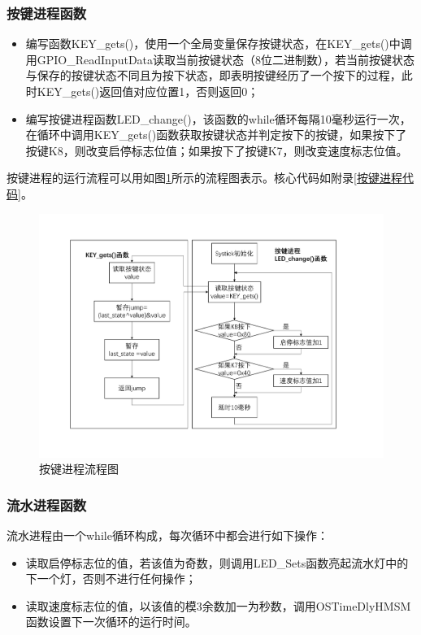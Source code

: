 \documentclass[a4paper]{ctexart}
\begin{document}
\begin{spacing}{1.3}
	\subsubsection{按键进程函数}\label{按键进程}
	\begin{itemize}
		\item 编写函数KEY\_gets()，使用一个全局变量保存按键状态，在KEY\_gets()中调用GPIO\_ReadInputData读取当前按键状态（8位二进制数），若当前按键状态与保存的按键状态不同且为按下状态，即表明按键经历了一个按下的过程，此时KEY\_gets()返回值对应位置1，否则返回0；
		\item 编写按键进程函数LED\_change()，该函数的while循环每隔10毫秒运行一次，在循环中调用KEY\_gets()函数获取按键状态并判定按下的按键，如果按下了按键K8，则改变启停标志位值；如果按下了按键K7，则改变速度标志位值。
	\end{itemize}

	按键进程的运行流程可以用如图\ref{fig:KEY流程图}所示的流程图表示。核心代码如附录\ref{按键进程代码}。

	\begin{figure}[htbp]
		\centering
		\includegraphics[width=\textwidth]{figure/KEYflow.pdf}
		\caption{按键进程流程图}\label{fig:KEY流程图}
	\end{figure}

	\subsubsection{流水进程函数}\label{流水进程}
	流水进程由一个while循环构成，每次循环中都会进行如下操作：
	\begin{itemize}
		\item 读取启停标志位的值，若该值为奇数，则调用LED\_Sets函数亮起流水灯中的下一个灯，否则不进行任何操作；
		\item 读取速度标志位的值，以该值的模3余数加一为秒数，调用OSTimeDlyHMSM函数设置下一次循环的运行时间。
	\end{itemize}


\end{spacing}
\end{document}
